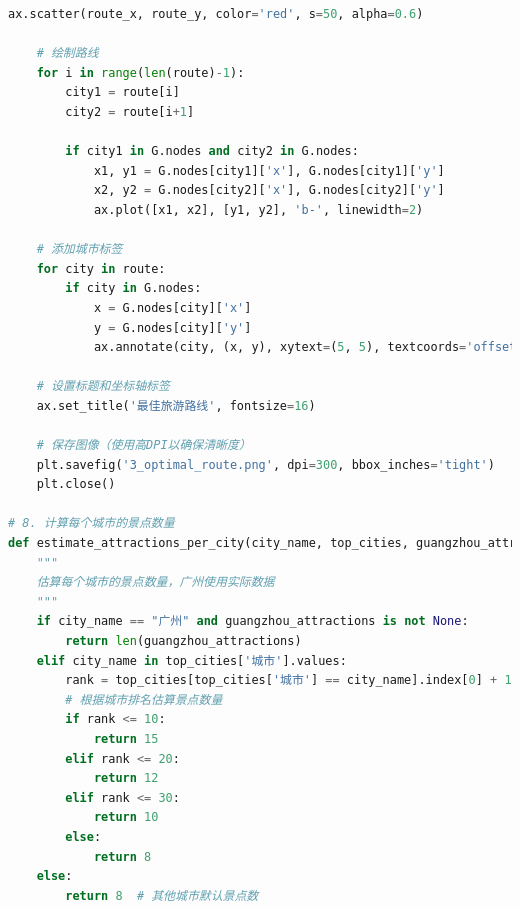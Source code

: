 \documentclass[withoutpreface,bwprint]{cumcmthesis} %
\begin{document}
\begin{appendices}
\begin{lstlisting}[language=python]
    ax.scatter(route_x, route_y, color='red', s=50, alpha=0.6)
    
    # 绘制路线
    for i in range(len(route)-1):
        city1 = route[i]
        city2 = route[i+1]
        
        if city1 in G.nodes and city2 in G.nodes:
            x1, y1 = G.nodes[city1]['x'], G.nodes[city1]['y']
            x2, y2 = G.nodes[city2]['x'], G.nodes[city2]['y']
            ax.plot([x1, x2], [y1, y2], 'b-', linewidth=2)
    
    # 添加城市标签
    for city in route:
        if city in G.nodes:
            x = G.nodes[city]['x']
            y = G.nodes[city]['y']
            ax.annotate(city, (x, y), xytext=(5, 5), textcoords='offset points', fontsize=10)
    
    # 设置标题和坐标轴标签
    ax.set_title('最佳旅游路线', fontsize=16)
    
    # 保存图像（使用高DPI以确保清晰度）
    plt.savefig('3_optimal_route.png', dpi=300, bbox_inches='tight')
    plt.close()

# 8. 计算每个城市的景点数量
def estimate_attractions_per_city(city_name, top_cities, guangzhou_attractions=None):
    """
    估算每个城市的景点数量，广州使用实际数据
    """
    if city_name == "广州" and guangzhou_attractions is not None:
        return len(guangzhou_attractions)
    elif city_name in top_cities['城市'].values:
        rank = top_cities[top_cities['城市'] == city_name].index[0] + 1
        # 根据城市排名估算景点数量 
        if rank <= 10:
            return 15
        elif rank <= 20:
            return 12
        elif rank <= 30:
            return 10
        else:
            return 8
    else:
        return 8  # 其他城市默认景点数
    

\end{lstlisting}
\end{appendices}
\end{document}
